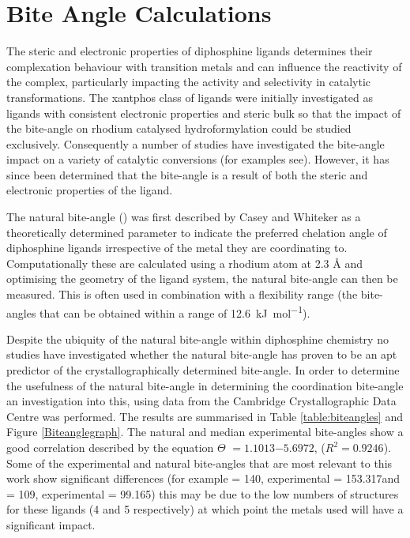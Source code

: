 {%

\section{Bite Angle Calculations}

The steric and electronic properties of diphosphine ligands determines their complexation behaviour with transition metals and can influence the reactivity of the complex, particularly impacting the activity and selectivity in catalytic transformations.\cite{Freixa2003, Birkholz2009}  The xantphos class of ligands were initially investigated as ligands with consistent electronic properties and steric bulk so that the impact of the bite-angle on rhodium catalysed hydroformylation could be studied exclusively.\cite{Kranenburg1995}  Consequently a number of studies have investigated the bite-angle impact on a variety of catalytic conversions (for examples see\cite{Kranenburg1995b, Haaren2001b, Dudle2011b, Fanjul2013, Birkholz2009}).  However, it has since been determined that the bite-angle is a result of both the steric and electronic properties of the ligand.\cite{Freixa2003}

The natural bite-angle (\natbiteangle) was first described by Casey and Whiteker\cite{Casey1990} as a theoretically determined parameter to indicate the preferred chelation angle of diphosphine ligands irrespective of the metal they are coordinating to.  Computationally these are calculated using a rhodium atom at 2.3 \si{\angstrom} and optimising the geometry of the ligand system, the natural bite-angle can then be measured.  This is often used in combination with a flexibility range (the bite-angles that can be obtained within a range of 12.6~\si{\kilo\joule\per\mol}).  

Despite the ubiquity of the natural bite-angle within diphosphine chemistry no studies have investigated whether the natural bite-angle has proven to be an apt predictor of the crystallographically determined bite-angle.  In order to determine the usefulness of the natural bite-angle in determining the coordination bite-angle an investigation into this, using data from the Cambridge Crystallographic Data Centre was performed.  The results are summarised in Table \ref{table:biteangles} and Figure \ref{Biteanglegraph}.  The natural and median experimental bite-angles show a good correlation described by the equation $\Theta$ $= 1.1013$\natbiteangle $- 5.6972$, ($R^2 = 0.9246$).  Some of the experimental and natural bite-angles that are most relevant to this work show significant differences (for example \tBuxantphos{} \natbiteangle{} = 140\degrees, experimental = 153.317\degrees and \Phsixantphos{} \natbiteangle{} = 109, experimental = 99.165\degrees) this may be due to the low numbers of structures for these ligands (4 and 5 respectively) at which point the metals used will have a significant impact. 

}
